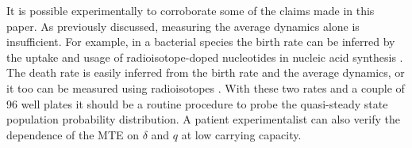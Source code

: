 It is possible experimentally to corroborate some of the claims made in this paper.
As previously discussed, measuring the average dynamics alone is insufficient. 
For example, in a bacterial species the birth rate can be inferred by the uptake and usage of radioisotope-doped nucleotides in nucleic acid synthesis \cite{Kirchman1982}. 
The death rate is easily inferred from the birth rate and the average dynamics, or it too can be measured using radioisotopes \cite{Servais1985}. %
With these two rates and a couple of 96 well plates it should be a routine procedure to probe the quasi-steady state population probability distribution. 
A patient experimentalist can also verify the dependence of the MTE on $\delta$ and $q$ at low carrying capacity. 

